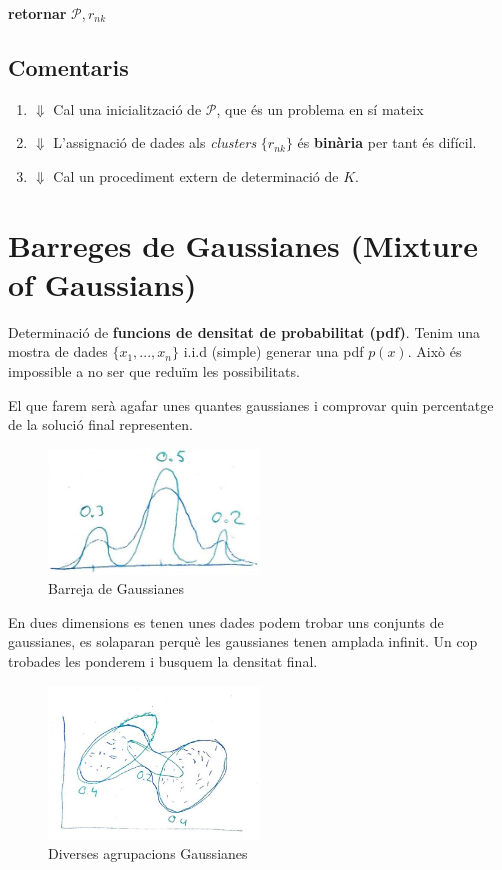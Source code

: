 \documentclass[a4paper]{article}
\begin{document}
\textbf{retornar} $\mathcal{P},r_{nk}$


\subsection{Comentaris}

\begin{enumerate}
	\item $\Downarrow$ Cal una inicialització de $\mathcal{P}$, que és un problema en sí mateix
	\item $\Downarrow$ L'assignació de dades als \emph{clusters} $\{r_{nk}\}$ és \textbf{binària} per tant és difícil.
	\item $\Downarrow$ Cal un procediment extern de determinació de $K$.
\end{enumerate}

\section{Barreges de Gaussianes (Mixture of Gaussians)}

Determinació de \textbf{funcions de densitat de probabilitat (pdf)}. Tenim una mostra de dades  $\{x_1,...,x_n\}$ i.i.d (simple) generar una pdf $p(x)$. Això és impossible a no ser que reduïm les possibilitats.

El que farem serà agafar unes quantes gaussianes i comprovar quin percentatge de la solució final representen.

\begin{figure}[H]
    \centering
    \includegraphics[width=0.5\textwidth]{figura_5}
    \caption{Barreja de Gaussianes}
\end{figure}

En dues dimensions es tenen unes dades podem trobar uns conjunts de gaussianes, es solaparan perquè les gaussianes tenen amplada infinit. Un cop trobades les ponderem i busquem la densitat final.

\begin{figure}[H]
    \centering
    \includegraphics[width=0.5\textwidth]{figura_6}
    \caption{Diverses agrupacions Gaussianes}
\end{figure}
\end{document}
